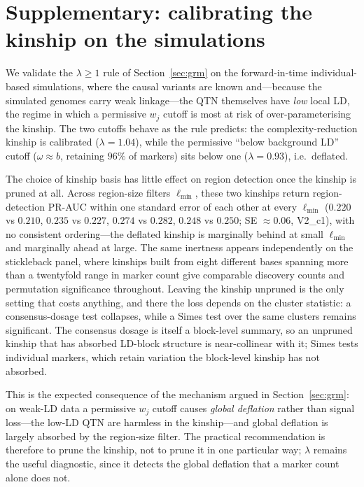 \documentclass[11pt]{article}
\begin{document}
\section{Supplementary: calibrating the kinship on the simulations}
\label{sec:supp-grm}

We validate the $\lambda \ge 1$ rule of Section~\ref{sec:grm} on the forward-in-time individual-based
simulations, where the causal variants are known and---because the simulated
genomes carry weak linkage---the QTN themselves have \emph{low} local LD, the
regime in which a permissive $w_j$ cutoff is most at risk of over-parameterising
the kinship. The two cutoffs behave as the rule predicts: the
complexity-reduction kinship is calibrated ($\lambda = 1.04$), while the
permissive ``below background LD'' cutoff ($\omega \approx b$, retaining $96\%$
of markers) sits below one ($\lambda = 0.93$), i.e.\ deflated.

The choice of kinship basis has little effect on region detection once the
kinship is pruned at all. Across region-size filters $\ell_{\min}$, these two kinships
return region-detection PR-AUC within one standard error of each other at every
$\ell_{\min}$ ($0.220$ vs $0.210$, $0.235$ vs
$0.227$, $0.274$ vs $0.282$, $0.248$ vs $0.250$; SE $\approx 0.06$, V2\_c1), with no consistent ordering---the deflated kinship is
marginally behind at small $\ell_{\min}$ and marginally ahead at large. The same
inertness appears independently on the stickleback panel, where kinships built
from eight different bases spanning more than a twentyfold range in marker count
give comparable discovery counts and permutation significance throughout.
Leaving the kinship unpruned is the only setting that costs anything, and there
the loss depends on the cluster statistic: a consensus-dosage test collapses,
while a Simes test over the same clusters remains significant. The consensus
dosage is itself a block-level summary, so an unpruned kinship that has absorbed
LD-block structure is near-collinear with it; Simes tests individual markers,
which retain variation the block-level kinship has not absorbed.

This is the expected consequence of the mechanism argued in
Section~\ref{sec:grm}: on weak-LD data a permissive $w_j$ cutoff causes
\emph{global deflation} rather than signal loss---the low-LD QTN are harmless in
the kinship---and global deflation is largely absorbed by the region-size filter.
The practical recommendation is therefore to prune the kinship, not to prune it
in one particular way; $\lambda$ remains the useful diagnostic, since it detects
the global deflation that a marker count alone does not.
\end{document}
